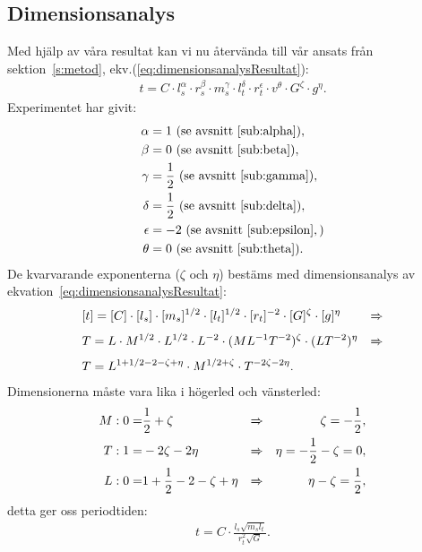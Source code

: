 \documentclass[a4paper]{article}
\begin{document}
\subsection{Dimensionsanalys}
Med hjälp av våra resultat kan vi nu återvända till vår ansats från sektion~\ref{s:metod}, ekv.(\ref{eq:dimensionsanalysResultat}):
\begin{align*}
    t= C \cdot l_s^\alpha \cdot r_s^\beta \cdot m_s^\gamma \cdot l_t^\delta \cdot r_t^\epsilon \cdot v^\theta \cdot G^\zeta \cdot g^\eta.
\end{align*}
Experimentet har givit:
\begin{align*}
    \alpha &= 1 \text{ (se avsnitt~\ref{sub:alpha}}),\\
    \beta &= 0 \text{ (se avsnitt~\ref{sub:beta}}),\\
    \gamma &= \frac{1}{2} \text{ (se avsnitt~\ref{sub:gamma}}),\\
    \delta &= \frac{1}{2} \text{ (se avsnitt~\ref{sub:delta}}),\\
    \epsilon &= -2 \text{ (se avsnitt~\ref{sub:epsilon}},)\\
    \theta &= 0 \text{ (se avsnitt~\ref{sub:theta}}).
\end{align*}
De kvarvarande exponenterna ($\zeta$ och $\eta$) bestäms med dimensionsanalys av ekvation~\ref{eq:dimensionsanalysResultat}:
\begin{align*}
    &[t]= [C] \cdot [l_s] \cdot [m_s]^{1/2} \cdot [l_t]^{1/2} \cdot [r_t]^{-2} \cdot [G]^\zeta \cdot [g]^\eta
    &\xRightarrow{} \\
    &T = L \cdot M^{1/2} \cdot L^{1/2} \cdot L^{-2} \cdot (ML^{-1}T^{-2})^\zeta \cdot (LT^{-2})^\eta &\xRightarrow{}\\
    &T = L^{1+1/2-2-\zeta+\eta} \cdot M^{1/2+\zeta} \cdot T^{-2\zeta-2\eta}.
\end{align*}
Dimensionerna måste vara lika i högerled och vänsterled:
\begin{align*}
    M : 0 = &\frac{1}{2}+\zeta &\xRightarrow{}&&\zeta=-\frac{1}{2},\\
    T : 1 = &-2\zeta-2\eta &\xRightarrow{}&&\eta = -\frac{1}{2}-\zeta = 0,\\
    L : 0 = &1+\frac{1}{2}-2-\zeta+\eta &\xRightarrow{}&&\eta-\zeta =\frac{1}{2},
\end{align*}
detta ger oss periodtiden:
\begin{align}
    \label{eq:formelUtanKonstant}
    t = C \cdot \frac{l_s\sqrt{m_sl_t}}{r_t^2\sqrt{G}}.
\end{align}
\end{document}
